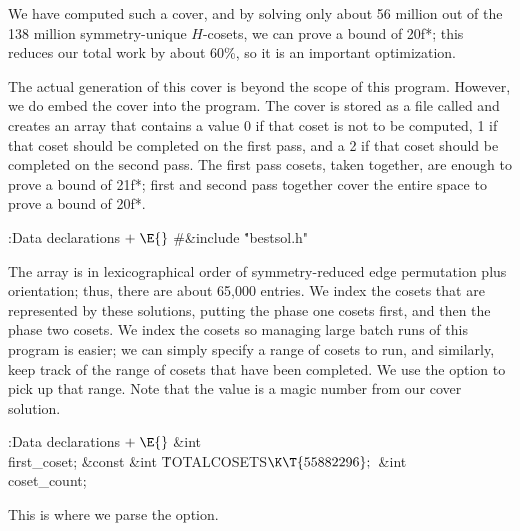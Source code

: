 We have computed such a cover, and by solving only about 56 million
out of the 138 million symmetry-unique $H$-cosets, we can prove a
bound of 20f*; this reduces our total work by about 60\%, so it is an
important optimization.

The actual generation of this cover is beyond the scope of this
program.  However, we do embed the cover into the program.  The cover
is stored as a file called  and creates an array 
that contains a value 0 if that coset is not to be computed, 1 if that
coset should be completed on the first pass, and a 2 if that coset
should be completed on the second pass.  The first pass cosets, taken
together, are enough to prove a bound of 21f*; first and second pass
together cover the entire space to prove a bound of 20f*.

\Y\B\4:Data declarations\X${}\mathrel+\E{}$\6
\8\#\&{include} \.{"bestsol.h"}\par
\fi

The  array is in lexicographical order of
symmetry-reduced
edge permutation plus orientation; thus, there are about 65,000
entries.  We index the cosets that are represented by these solutions,
putting the phase one cosets first, and then the phase two cosets.  We
index the cosets so managing large batch runs of this program is
easier; we can simply specify a range of cosets to run, and similarly,
keep track of the range of cosets that have been completed.  We use
the  option to pick up that range.  Note that the 
value is a magic number from our cover solution.

\Y\B\4:Data declarations\X${}\mathrel+\E{}$\6
\&{int} \\{first\_coset};\6
\&{const} \&{int} \.{TOTALCOSETS}${}\K\T{55882296};{}$\6
\&{int} \\{coset\_count};\par
\fi

This is where we parse the option.

